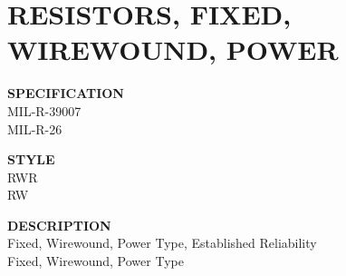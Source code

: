 \section{RESISTORS, FIXED, WIREWOUND, POWER}

\begin{minipage}[t]{0.24\textwidth}
    \textbf{SPECIFICATION}\\
    MIL-R-39007\\MIL-R-26
\end{minipage}
\hfill
\begin{minipage}[t]{0.12\textwidth}
    \textbf{STYLE}\\
    RWR\\RW
\end{minipage}
\hfill
\begin{minipage}[t]{0.61\textwidth}
    \textbf{DESCRIPTION}\\
    Fixed, Wirewound, Power Type, Established Reliability\\Fixed, Wirewound, Power Type
\end{minipage}


